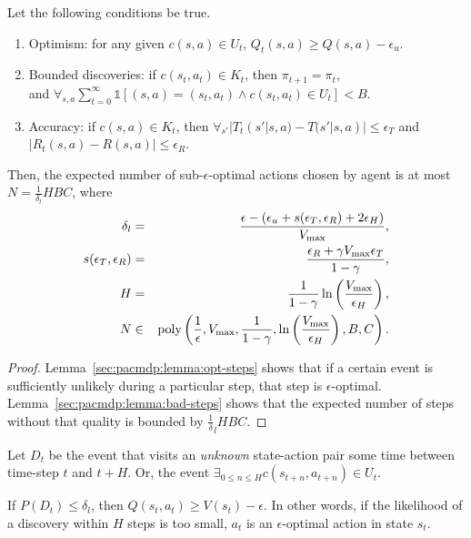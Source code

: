 \begin{thm}
Let the following conditions be true.
\begin{enumerate}
\item
\label{sec:pacmdp:cond:opt}
Optimism: for any given $c(s,a) \in U_t$, $Q_t(s,a) \geq Q(s,a) - \epsilon_u$.
\item
\label{sec:pacmdp:cond:bounded}
Bounded discoveries: if $c(s_t, a_t) \in K_t$, then $\pi_{t+1} = \pi_{t}$,\\ and $\forall_{s,a} \sum_{t=0}^\infty \mathbb{1}\left[(s,a) = (s_t,a_t) \wedge c(s_t,a_t) \in U_t\right] < B$.
\item
\label{sec:pacmdp:cond:acc}
Accuracy: if $c(s,a) \in K_t$, then $\forall_{s'}|T_t(s'|s,a)-T(s'|s,a)| \leq \epsilon_T$ and $|R_t(s,a)-R(s,a)|\leq\epsilon_R$.
\end{enumerate}
Then, the expected number of sub-$\epsilon$-optimal actions chosen by agent \A is at most $N = \frac 1 {\delta_l} H B C$, where
\begin{eqnarray}
\delta_l &=& \frac {\epsilon - (\epsilon_u + s(\epsilon_T,\epsilon_R) +2 \epsilon_H)} {V_{\rm max}},\\
s(\epsilon_T,\epsilon_R) &=& \frac {\epsilon_R + \gamma V_{\rm max} \epsilon_T} {1-\gamma},\\
H&=&\frac 1 {1-\gamma} \ln\left(\frac  {V_{\rm max}} {\epsilon_H}\right),\\
N&\in&\mbox{poly}\left(\frac 1 \epsilon, V_{\rm max}, \frac{1}{1-\gamma}, \ln\left(\frac {V_{\rm max}} {\epsilon_H}\right), B, C\right).
\end{eqnarray}
\end{thm}

\begin{proof}
Lemma~\ref{sec:pacmdp:lemma:opt-steps} shows that if a certain event is sufficiently unlikely during a particular step, that step is $\epsilon$-optimal. Lemma~\ref{sec:pacmdp:lemma:bad-steps} shows that the expected number of steps without that quality is bounded by $\frac 1 \delta_l H B C$.
\end{proof}

\begin{defn}
Let $D_t$ be the event that \A visits an \emph{unknown} state-action pair some time between time-step $t$ and $t+H$. Or, the event $\exists_{0\leq n\leq H} c(s_{t+n},a_{t+n}) \in U_t$.
\end{defn}

\begin{lemma}
\label{sec:pacmdp:lemma:opt-steps}
If $P(D_t) \leq \delta_l$, then $Q(s_t,a_t) \geq V(s_t) - \epsilon$. In other words, if the likelihood of a discovery within $H$ steps is too small, $a_t$ is an $\epsilon$-optimal action in state $s_t$.
\end{lemma}

